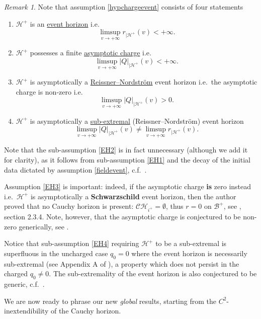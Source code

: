 \documentclass[10pt,a4paper]{article}
\theoremstyle{plain}
\theoremstyle{remark}
\newtheorem{rmk}{Remark}[section]
\theoremstyle{definition}
\theoremstyle{plain}
\theoremstyle{remark}
\theoremstyle{definition}
\newcommand{\CH}{\mathcal{CH}_{i^+}}
\numberwithin{equation}{section}
\begin{document}
\begin{rmk}\label{EHremark}
	Note that assumption \ref{hypchargeevent} consists of four statements \begin{enumerate}[i]
		\item \label{EH1} $\mathcal{H}^+$ is an \underline{event horizon} i.e.\ $$ \limsup_{v\rightarrow+\infty} r_{|\mathcal{H}^+}(v) < +\infty.$$
		\item \label{EH2}  $\mathcal{H}^+$ possesses a finite  \underline{asymptotic charge} i.e.\ $$ \limsup_{v\rightarrow+\infty} |Q|_{|\mathcal{H}^+}(v)<+\infty.$$ \item \label{EH3}  $\mathcal{H}^+$ is asymptotically a  \underline{Reissner--Nordstr\"{o}m} event horizon i.e.\ the asymptotic charge is non-zero i.e.\ $$ \limsup_{v\rightarrow+\infty} |Q|_{|\mathcal{H}^+}(v)>0.$$
		\item \label{EH4}  $\mathcal{H}^+$ is asymptotically a \underline{sub-extremal} (Reissner--Nordstr\"{o}m) event horizon  $$ \limsup_{v\rightarrow+\infty} |Q|_{|\mathcal{H}^+}(v) \neq   \limsup_{v\rightarrow+\infty} r_{|\mathcal{H}^+}(v).$$
	\end{enumerate}
Note that the sub-assumption \ref{EH2} is in fact unnecessary (although we add it for clarity), as it follows from sub-assumption \ref{EH1} and the decay of the initial data dictated by assumption \ref{fieldevent}, c.f.\ \cite{Moi}.

  	Assumption \ref{EH3} is important: indeed, if the asymptotic charge \textbf{is} zero instead i.e.\  $\mathcal{H}^+$ is asymptotically a \textbf{Schwarzschild} event horizon, then the author proved that no Cauchy horizon is present: $\CH=\emptyset$, thus $r=0$ on $\mathcal{B}^+$, see \cite{MoiThesis}, section 2.3.4. Note, however, that the asymptotic charge is conjectured to be non-zero generically, see \cite{Kommemi}.
  	
  	
	 Notice that sub-assumption \ref{EH4} requiring $\mathcal{H}^+$ to be a sub-extremal is superfluous in the uncharged case $q_0=0$ where the event horizon is necessarily sub-extremal (see Appendix A of \cite{JonathanStab}), a property which does not persist in the charged  $q_0 \neq 0$. The sub-extremality of the event horizon is also conjectured to be generic, c.f.\  \cite{Kommemi}.
	 
	 	\end{rmk}

\color{black}


We are now ready to phrase our new \textit{global} results, starting from the $C^2$-inextendibility of the Cauchy horizon.
\end{document}
